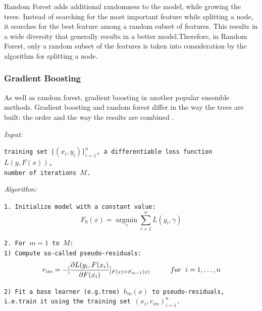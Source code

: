 \documentclass[11pt, a4paper, leqno]{article}
\begin{document}
Random Forest adds additional randomness to the model, while growing the trees. Instead of searching for the most important feature while splitting a node, it searches for the best feature among a random subset of features. This results in a wide diversity that generally results in a better model.Therefore, in Random Forest, only a random subset of the features is taken into consideration by the algorithm for splitting a node.

\subsubsection{Gradient Boosting}
As well as random forest, gradient boosting in another popular ensemble methods. Gradient boosting and random forest differ in the way the trees are built: the order and the way the results are combined \cite{ogutu2011comparison}.

\hspace*{6mm}\textit{Input:}

\hspace*{6mm}\texttt{training set $\{(x_{i},y_{i})\}_{i=1}^{n}$, a differentiable loss function $L(y,F(x))$,\\\hspace*{10mm} number of iterations $M$.}

\hspace*{6mm}\textit{Algorithm:}

\hspace*{6mm}\texttt{1. Initialize model with a constant value:}
\begin{equation}
F_0(x)=\operatorname*{argmin}_\gamma\sum_{i=1}^{n}L(y_i,\gamma)
\end{equation}

\hspace*{6mm}\texttt{2. For $m=1$ to $M$:}\\
\hspace*{20mm}\texttt{1) Compute so-called pseudo-residuals:}
\begin{equation}
r_{im}=-[\frac{\partial L(y_i,F(x_i)}{\partial F(x_i)}]_{F(x)=F_{m-1}(x)} \hspace*{10mm}for\hspace{2mm} i=1,\dots,n
\end{equation}

\hspace*{20mm}\texttt{2) Fit a base learner (e.g.tree) $h_{m}(x)$ to pseudo-residuals, \\ \hspace*{34mm}i.e.train it using the training set ${(x_{i},r_{im})}_{i=1}^{n}$.}
\end{document}
